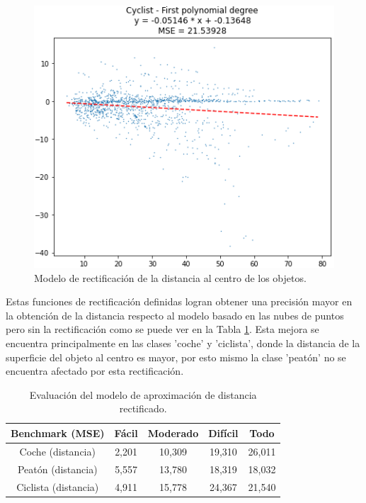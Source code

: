 \begin{figure}[H]
\begin{minipage}{0.32\textwidth}
	\end{minipage}\hfill
	\begin{minipage}{0.32\textwidth}
		\centering
		\includegraphics[width=1\linewidth]{Book/figures/6_approx_distancia/rectification_lidar_cyclist.png}
	\end{minipage}
	\caption{Modelo de rectificación de la distancia al centro de los objetos.}
	\label{fig:Modelo de rectificación de la distancia al centro de los objetos.}
\end{figure}

Estas funciones de rectificación definidas logran obtener una precisión mayor en la obtención de la distancia respecto al modelo basado en las nubes de puntos pero sin la rectificación como se puede ver en la Tabla \ref{fig:Evaluación del modelo de aproximación de distancia rectificado.}. Esta mejora se encuentra principalmente en las clases 'coche' y 'ciclista', donde la distancia de la superficie del objeto al centro es mayor, por esto mismo la clase 'peatón' no se encuentra afectado por esta rectificación.

\begin{table}[H]
\centering
\begin{tabular}{|c|c|c|c|c|}
\hline
\textbf{Benchmark (MSE)} & \textbf{Fácil} & \textbf{Moderado} & \textbf{Difícil} & \textbf{Todo}\\ \hline \hline
Coche (distancia)        & 2,201          & 10,309             & 19,310       & 26,011     \\ \hline
Peatón (distancia)       & 5,557          & 13,780             & 18,319       & 18,032     \\ \hline
Ciclista (distancia)     & 4,911          & 15,778             & 24,367       & 21,540  \\ \hline
\end{tabular}
\caption{Evaluación del modelo de aproximación de distancia rectificado.}
\label{fig:Evaluación del modelo de aproximación de distancia rectificado.}
\end{table}


